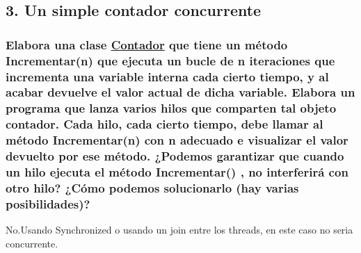 \subsection*{3. Un simple contador concurrente}

\subsubsection*{Elabora una clase \hyperlink{classContador}{Contador} que tiene un método Incrementar(n) que ejecuta un bucle de n iteraciones que incrementa una variable interna cada cierto tiempo, y al acabar devuelve el valor actual de dicha variable. Elabora un programa que lanza varios hilos que comparten tal objeto contador. Cada hilo, cada cierto tiempo, debe llamar al método Incrementar(n) con n adecuado e visualizar el valor devuelto por ese método. ¿\+Podemos garantizar que cuando un hilo ejecuta el método Incrementar() , no interferirá con otro hilo? ¿\+Cómo podemos solucionarlo (hay varias posibilidades)?}

No.\+Usando Synchronized o usando un join entre los threads, en este caso no seria concurrente. 